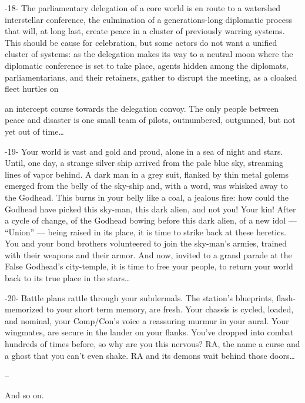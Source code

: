                                                     -18-  
The parliamentary delegation of a core world is en route to a watershed interstellar conference,  
the culmination of a generations-long diplomatic process that will, at long last, create peace in a  
cluster of previously warring systems. This should be cause for celebration, but some actors do  
not want a unified cluster of systems: as the delegation makes its way to a neutral moon where  
the diplomatic conference is set to take place, agents hidden among the diplomats,  
parliamentarians, and their retainers, gather to disrupt the meeting, as a cloaked fleet hurtles on  

                                                                                                          


an intercept course towards the delegation convoy. The only people between peace and disaster  
is one small team of pilots, outnumbered, outgunned, but not yet out of time…  

                                                        -19-  
Your world  is vast and gold and proud, alone in a sea of night and stars. Until, one day, a strange  
silver ship arrived from the pale blue sky, streaming lines of vapor behind. A dark man in a grey  
suit, flanked by thin metal golems emerged from the belly of the sky-ship and, with a word, was  
whisked away to the Godhead. This burns in your belly like a coal, a jealous fire: how could the  
Godhead have picked this sky-man, this dark alien, and not you! Your kin! After a cycle of change,  
of the Godhead bowing before this dark alien, of a new idol — “Union” — being raised in its  
place, it is time to strike back at these heretics. You and your bond brothers volunteered to join  
the sky-man’s armies, trained with their weapons and their armor. And now, invited to a grand  
parade at the False Godhead’s city-temple, it is time to free your people, to return your world  
back to its true place in the stars…  

                                                        -20-  
Battle plans rattle through your subdermals. The station’s blueprints, flash-memorized to your  
short term memory, are fresh. Your chassis is cycled, loaded, and nominal, your Comp/Con’s  
voice a reassuring murmur in your aural. Your wingmates, are secure in the lander on your flanks.  
You’ve dropped into combat hundreds of times before, so why are you this nervous? RA, the  
name a curse and a ghost that you can’t even shake. RA and its demons wait behind those  
doors…  

--  

And so on.   

                                                                                                                  


